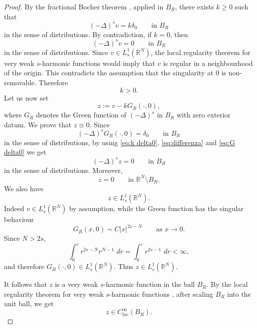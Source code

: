 \documentclass[11pt,a4paper]{article}
\newcommand{\dd}{\,d}
\newcommand{\loc}{\mathrm{loc}}
\begin{document}
\begin{proof}
By the fractional Bocher theorem \cite[Theorem~4]{LiWuXu}, applied in \(B_R\), there exists \(k\ge0\)
such that
\begin{equation}\label{eq:k delta0}
(-\Delta)^s v=k\delta_0
\qquad\text{in }B_R
\end{equation}
in the sense of distributions. By contradiction, if \(k=0\), then
\[
(-\Delta)^s v=0
\qquad\text{in }B_R
\]
in the sense of distributions. Since \(v\in L^1_s(\mathbb R^N)\), the local
regularity theorem for very weak \(s\)-harmonic functions \cite[Main Theorem, item~(2)]{CarbottiCitoLaMannaPallara} would imply that
\(v\) is regular in a neighbourhood of the origin. This contradicts the
assumption that the singularity at \(0\) is non-removable. Therefore
\[
k>0.
\]
Let us now set
\begin{equation}\label{eq:differenza}
z:=v-kG_R(\cdot,0),
\end{equation}
where \(G_R\) denotes the Green function of \((-\Delta)^s\) in \(B_R\) with zero
exterior datum. We prove that \(z\equiv 0\). Since
\begin{equation}\label{eq:G delta0}
(-\Delta)^sG_R(\cdot,0)=\delta_0
\qquad\text{in }B_R
\end{equation}
in the sense of distributions, by using \eqref{eq:k delta0},  \eqref{eq:differenza} and \eqref{eq:G delta0} we get
\[
(-\Delta)^s z=0
\qquad\text{in }B_R
\]
in the sense of distributions. Moreover,
\[
z=0
\qquad\text{in }\mathbb R^N\setminus B_R.
\]
We also have
\[
z\in L^1_s(\mathbb R^N).
\]
Indeed \(v\in L^1_s(\mathbb R^N)\) by assumption, while the Green function has
the singular behaviour
\[
G_R(x,0)\sim C|x|^{2s-N}
\qquad\text{as }x\to0.
\]
Since \(N>2s\),
\[
\int_0^\varepsilon r^{2s-N}r^{N-1}\,\dd r
=
\int_0^\varepsilon r^{2s-1}\,\dd r<\infty,
\]
and therefore \(G_R(\cdot,0)\in L^1_s(\mathbb R^N)\). Thus
\(z\in L^1_s(\mathbb R^N)\).

It follows that \(z\) is a very weak \(s\)-harmonic function in the ball
\(B_R\). By the local regularity theorem for very weak \(s\)-harmonic functions \cite[Main Theorem, item~(2)]{CarbottiCitoLaMannaPallara},
after scaling \(B_R\) into the unit ball, we get
\[
z\in C^\infty_{\loc}(B_R).
\]


\end{proof}
\end{document}
